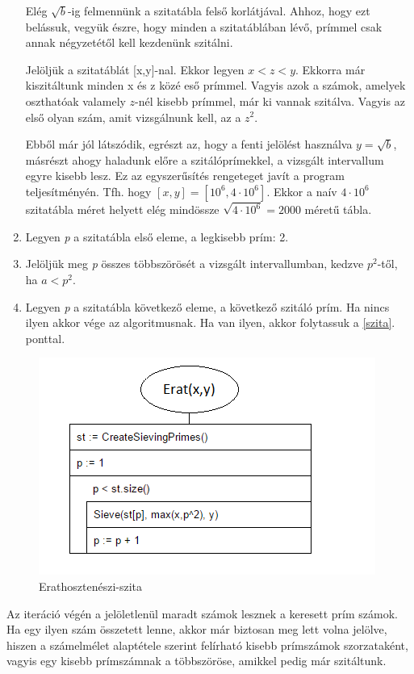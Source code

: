 \documentclass[twoside, a4paper, 12pt]{article}
\begin{document}
\begin{enumerate}
Elég $\sqrt{b}$-ig felmennünk a szitatábla felső korlátjával. Ahhoz, hogy ezt belássuk, vegyük észre, hogy minden a szitatáblában lévő, prímmel csak annak négyzetétől kell kezdenünk szitálni. \par 
Jelöljük a szitatáblát [x,y]-nal. Ekkor legyen $x < z < y$. Ekkorra már kiszitáltunk minden x és z közé eső prímmel. Vagyis azok a számok, amelyek oszthatóak valamely $z$-nél kisebb prímmel, már ki vannak szitálva. Vagyis az első olyan szám, amit vizsgálnunk kell, az a $z^2$. \par
Ebből már jól látszódik, egrészt az, hogy a fenti jelölést használva $y=\sqrt{b}$, másrészt ahogy haladunk előre a szitálóprímekkel, a vizsgált intervallum egyre kisebb lesz. Ez az egyszerűsítés rengeteget javít a program teljesítményén. Tfh. hogy $[x,y]=[10^6,4\cdot10^6]$. Ekkor a naív $4\cdot10^6$ szitatábla méret helyett elég mindössze $\sqrt{4\cdot10^6}=2000$ méretű tábla.
\item Legyen \textit{p} a szitatábla első eleme, a legkisebb prím: 2.
\item Jelöljük meg \textit{p} összes többszörösét a vizsgált intervallumban, kedzve $p^2$-től, ha $a<p^2 $. \label{szita}
\item Legyen \textit{p} a szitatábla következő eleme, a következő szitáló prím. Ha nincs ilyen akkor vége az algoritmusnak. Ha van ilyen, akkor folytassuk a \ref{szita}. ponttal.
\end{enumerate}

\begin{figure}[h]
\centering
\includegraphics{img/erat_stuki.png}
\caption{Erathosztenészi-szita}
\end{figure}

\bigskip
Az iteráció végén a jelöletlenül maradt számok lesznek a keresett prím számok. Ha egy ilyen szám összetett lenne, akkor már biztosan meg lett volna jelölve, hiszen a számelmélet alaptétele szerint felírható kisebb prímszámok szorzataként, vagyis egy kisebb prímszámnak a többszöröse, amikkel pedig már szitáltunk.
\end{document}

